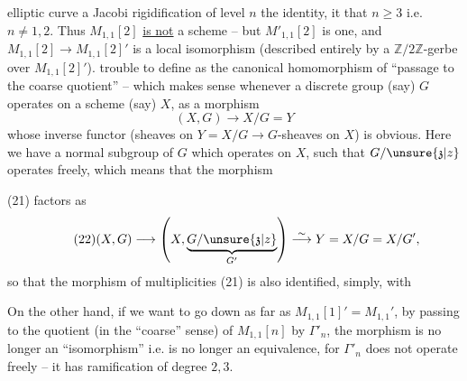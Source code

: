 elliptic curve  a Jacobi rigidification of level $n$  the identity, it  that $n\geq 3$ i.e. $n\neq 1,2$. Thus $M_{1,1}[2]$ \uline{is not} a scheme -- but $M'_{1,1}[2]$ is one, and $M_{1,1}[2]\to M_{1,1}[2]'$ is a  local isomorphism (described entirely by a $\mathbb Z/2\mathbb Z$-gerbe over $M_{1,1}[2]'$).   trouble to define
as the canonical homomorphism of ``passage to the coarse quotient'' -- which makes sense whenever a discrete group (say)\unsure{\S} $G$ operates on a scheme (say) $X$, as a morphism
\[
\tag{21}
(X,G)\longrightarrow X/G=Y
\]
whose inverse  functor (sheaves on $Y=X/G\longrightarrow G$-sheaves on $X$) is obvious. Here we have a normal subgroup  of $G$ which operates  on $X$, such that $G/\unsure{\mathfrak z|z}$ operates freely, which means that the morphism


(21) factors as
\[
\tag{22}
(X,G)\longrightarrow
\left(X,\underbrace{G/\unsure{\mathfrak z|z}}_{G'}\right)
\overset{\sim}{\longrightarrow}Y=X/G=X/G',
\]
so that the morphism of multiplicities (21) is also identified, simply, with

On the other hand, if we want to go down as far as $M_{1,1}[1]'=M_{1,1}'$, by passing to the quotient (in the ``coarse'' sense) of $M_{1,1}[n]$ by $\Gamma'_n$, the morphism
is no longer an ``isomorphism'' i.e. is no longer an equivalence, for $\Gamma'_n$ does not operate freely -- it has  ramification of degree $2,3$.

